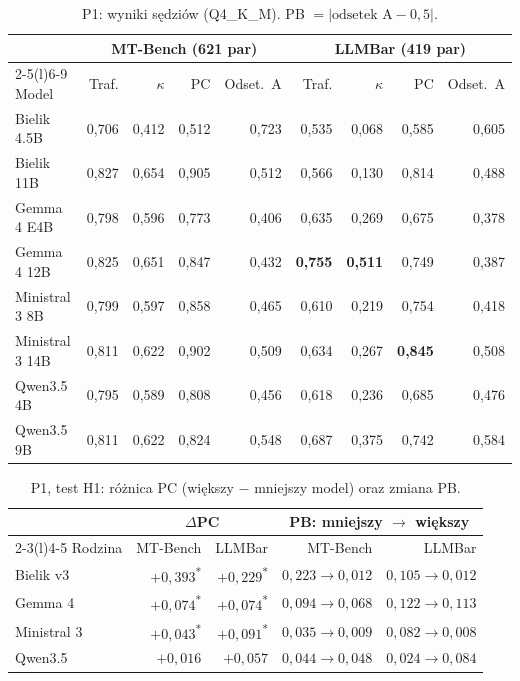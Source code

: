 \documentclass[10pt,a4paper]{article}
\newcommand{\s}{\textsuperscript{*}}
\begin{document}
\begin{table}[!htbp]
\centering\small
\caption{P1: wyniki sędziów (Q4\_K\_M). PB $=|\text{odsetek A}-0{,}5|$.}
\label{tab:p1}
\begin{tabular}{@{}l rrrr rrrr@{}}
\toprule
 & \multicolumn{4}{c}{MT-Bench (621 par)} & \multicolumn{4}{c}{LLMBar (419 par)} \\
\cmidrule(lr){2-5}\cmidrule(l){6-9}
Model & Traf. & $\kappa$ & PC & Odset.\ A & Traf. & $\kappa$ & PC & Odset.\ A \\
\midrule
Bielik 4.5B   & 0,706 & 0,412 & 0,512 & 0,723 & 0,535 & 0,068 & 0,585 & 0,605 \\
Bielik 11B    & 0,827 & 0,654 & 0,905 & 0,512 & 0,566 & 0,130 & 0,814 & 0,488 \\
Gemma 4 E4B   & 0,798 & 0,596 & 0,773 & 0,406 & 0,635 & 0,269 & 0,675 & 0,378 \\
Gemma 4 12B   & 0,825 & 0,651 & 0,847 & 0,432 & \textbf{0,755} & \textbf{0,511} & 0,749 & 0,387 \\
Ministral 3 8B  & 0,799 & 0,597 & 0,858 & 0,465 & 0,610 & 0,219 & 0,754 & 0,418 \\
Ministral 3 14B & 0,811 & 0,622 & 0,902 & 0,509 & 0,634 & 0,267 & \textbf{0,845} & 0,508 \\
Qwen3.5 4B    & 0,795 & 0,589 & 0,808 & 0,456 & 0,618 & 0,236 & 0,685 & 0,476 \\
Qwen3.5 9B    & 0,811 & 0,622 & 0,824 & 0,548 & 0,687 & 0,375 & 0,742 & 0,584 \\
\bottomrule
\end{tabular}
\end{table}

\begin{table}[!htbp]
\centering\small
\caption{P1, test H1: różnica PC (większy $-$ mniejszy model) oraz zmiana PB.}
\label{tab:h1}
\begin{tabular}{@{}l rr rr@{}}
\toprule
 & \multicolumn{2}{c}{$\Delta$PC} & \multicolumn{2}{c}{PB: mniejszy $\rightarrow$ większy} \\
\cmidrule(lr){2-3}\cmidrule(l){4-5}
Rodzina & MT-Bench & LLMBar & MT-Bench & LLMBar \\
\midrule
Bielik v3    & $+0{,}393$\s & $+0{,}229$\s & $0{,}223\rightarrow0{,}012$ & $0{,}105\rightarrow0{,}012$ \\
Gemma 4      & $+0{,}074$\s & $+0{,}074$\s & $0{,}094\rightarrow0{,}068$ & $0{,}122\rightarrow0{,}113$ \\
Ministral 3  & $+0{,}043$\s & $+0{,}091$\s & $0{,}035\rightarrow0{,}009$ & $0{,}082\rightarrow0{,}008$ \\
Qwen3.5      & $+0{,}016$ & $+0{,}057$ & $0{,}044\rightarrow0{,}048$ & $0{,}024\rightarrow0{,}084$ \\
\bottomrule
\end{tabular}
\end{table}
\end{document}
